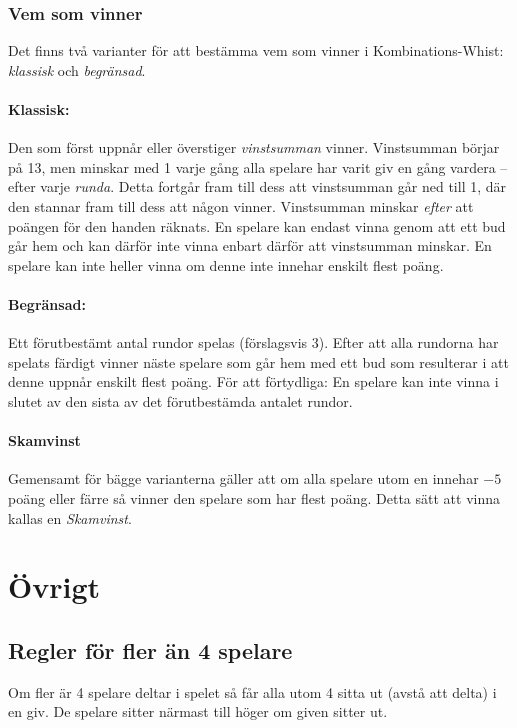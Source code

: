 \documentclass[a4paper]{article}
\begin{document}
	\subsubsection{Vem som vinner}
	\label{sec:winning}
	Det finns två varianter för att bestämma vem som vinner i Kombinations-Whist: \emph{klassisk} och \emph{begränsad}.

	\paragraph{Klassisk:}
	Den som först uppnår eller överstiger \emph{vinstsumman} vinner. Vinstsumman börjar på 13, men minskar med 1 varje gång alla spelare har varit giv en gång vardera -- efter varje \emph{runda}. Detta fortgår fram till dess att vinstsumman går ned till 1, där den stannar fram till dess att någon vinner. Vinstsumman minskar \emph{efter} att poängen för den handen räknats. En spelare kan endast vinna genom att ett bud går hem och kan därför inte vinna enbart därför att vinstsumman minskar. En spelare kan inte heller vinna om denne inte innehar enskilt flest poäng.

	\paragraph{Begränsad:}
	Ett förutbestämt antal rundor spelas (förslagsvis 3). Efter att alla rundorna har spelats färdigt vinner näste spelare som går hem med ett bud som resulterar i att denne uppnår enskilt flest poäng. För att förtydliga: En spelare kan inte vinna i slutet av den sista av det förutbestämda antalet rundor.

	\paragraph{Skamvinst} Gemensamt för bägge varianterna gäller att om alla spelare utom en innehar $-5$ poäng eller färre så vinner den spelare som har flest poäng. Detta sätt att vinna kallas en \emph{Skamvinst}.

	\section{Övrigt}
	\subsection{Regler för fler än 4 spelare}
	Om fler är 4 spelare deltar i spelet så får alla utom 4 sitta ut (avstå att delta) i en giv. De spelare sitter närmast till höger om given sitter ut.
		
\end{document}
